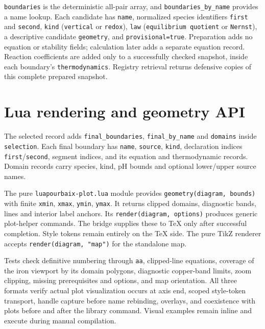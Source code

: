 \documentclass[a4paper,11pt]{ltxdoc}
\begin{document}
\texttt{boundaries} is the deterministic all-pair array, and
\texttt{boundaries\_by\_name} provides a name lookup. Each candidate has
\texttt{name}, normalized species identifiers \texttt{first} and \texttt{second},
\texttt{kind} (\texttt{vertical} or \texttt{redox}), \texttt{law}
(\texttt{equilibrium quotient} or \texttt{Nernst}), a descriptive candidate
\texttt{geometry}, and \texttt{provisional=true}. Preparation adds no equation or stability fields; calculation later adds a
separate equation record. Reaction coefficients are added only to a
successfully checked snapshot, inside each boundary's \texttt{thermodynamics}.
Registry retrieval returns defensive copies of this complete prepared snapshot.

\section{Lua rendering and geometry API}
The selected record adds \texttt{final\_boundaries}, \texttt{final\_by\_name}
and \texttt{domains} inside \texttt{selection}. Each final boundary has
\texttt{name}, \texttt{source}, \texttt{kind}, declaration indices
\texttt{first}/\texttt{second}, segment indices, and its equation and
thermodynamic records. Domain records carry species, kind, pH bounds and optional
lower/upper source names.

The pure \texttt{luapourbaix-plot.lua} module provides
\texttt{geometry(diagram, bounds)} with finite \texttt{xmin}, \texttt{xmax},
\texttt{ymin}, \texttt{ymax}. It returns clipped domains, diagnostic bands, lines
and interior label anchors. Its \texttt{render(diagram, options)} produces generic
plot-helper commands. The bridge supplies these to TeX only after successful
completion. Style tokens remain entirely on the TeX side. The pure TikZ renderer
accepts \texttt{render(diagram, "map")} for the standalone map.

Tests check definitive numbering through \texttt{aa}, clipped-line equations,
coverage of the iron viewport by its domain polygons, diagnostic copper-band
limits, zoom clipping, missing prerequisites and options, and map orientation.
All three formats verify actual plot visualization occurs at axis end, scoped
style-token transport, handle capture before name rebinding, overlays, and
coexistence with plots before and after the library command. Visual examples
remain inline and execute during manual compilation.
\end{document}
